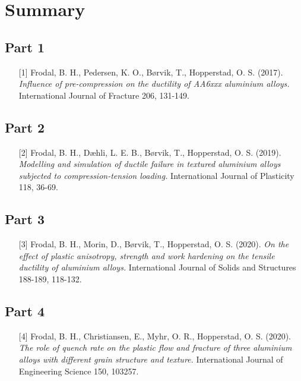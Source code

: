 \chapter{Summary}
\label{Ch:Summary}

\section{Part 1}
\begin{itemize}
    \item[{[1]}] Frodal, B. H., Pedersen, K. O., Børvik, T., Hopperstad, O. S. (2017). \textit{Influence of pre-compression on the ductility of AA6xxx aluminium alloys.} International Journal of Fracture 206, 131-149.
\end{itemize}





\section{Part 2}
\begin{itemize}
    \item[{[2]}] Frodal, B. H., Dæhli, L. E. B., Børvik, T., Hopperstad, O. S. (2019). \textit{Modelling and simulation of ductile failure in textured aluminium alloys subjected to compression-tension loading.} International Journal of Plasticity 118, 36-69.
\end{itemize}






\section{Part 3}
\begin{itemize}
    \item[{[3]}] Frodal, B. H., Morin, D., Børvik, T., Hopperstad, O. S. (2020). \textit{On the effect of plastic anisotropy, strength and work hardening on the tensile ductility of aluminium alloys.} International Journal of Solids and Structures 188-189, 118-132.
\end{itemize}






\section{Part 4}
\begin{itemize}
    \item[{[4]}] Frodal, B. H., Christiansen, E., Myhr, O. R., Hopperstad, O. S. (2020). \textit{The role of quench rate on the plastic flow and fracture of three aluminium alloys with different grain structure and texture.} International Journal of Engineering Science 150, 103257. 
\end{itemize}






